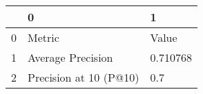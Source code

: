 \begin{tabular}{lll}
\toprule
{} &                       0 &         1 \\
\midrule
0 &                  Metric &     Value \\
1 &       Average Precision &  0.710768 \\
2 &  Precision at 10 (P@10) &       0.7 \\
\bottomrule
\end{tabular}

